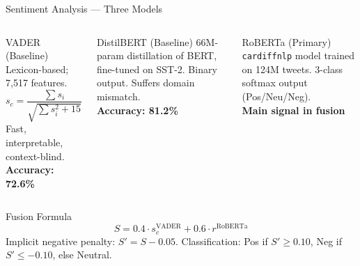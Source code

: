 \documentclass[aspectratio=169,xcolor=dvipsnames,10pt]{beamer}
\begin{document}
\begin{frame}{Sentiment Analysis --- Three Models}
    \begin{columns}[T]
        \begin{block}{VADER (Baseline)}
            \scriptsize
            Lexicon-based; 7,517 features.
            \[ s_c = \frac{\sum s_i}{\sqrt{\sum s_i^2 + 15}} \]
            Fast, interpretable, context-blind.\\[0.3em]
            \textbf{Accuracy: 72.6\%}
        \end{block}

        \begin{block}{DistilBERT (Baseline)}
            \scriptsize
            66M-param distillation of BERT, fine-tuned on SST-2. Binary output. Suffers domain mismatch.\\[1.4em]
            \textbf{Accuracy: 81.2\%}
        \end{block}

        \begin{block}{RoBERTa (Primary)}
            \scriptsize
            \texttt{cardiffnlp} model trained on 124M tweets. 3-class softmax output (Pos/Neu/Neg).\\[1.4em]
            \textbf{Main signal in fusion}
        \end{block}
    \end{columns}

    \vspace{0.6em}
    \begin{alertblock}{Fusion Formula}
        \centering
        \[ \boxed{S = 0.4 \cdot s_c^{\text{VADER}} + 0.6 \cdot r^{\text{RoBERTa}}} \]
        Implicit negative penalty: $S' = S - 0.05$. \quad Classification: Pos if $S' \geq 0.10$, Neg if $S' \leq -0.10$, else Neutral.
    \end{alertblock}
\end{frame}
\end{document}
